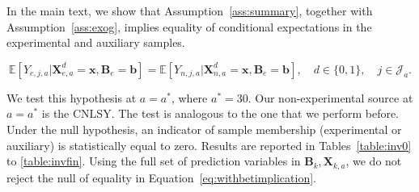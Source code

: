 \noindent In the main text, we show that Assumption~\ref{ass:summary}, together with Assumption~\ref{ass:exog}, implies equality of conditional expectations in the experimental and auxiliary samples.

\begin{equation}\label{eq:withbetimplication}
\mathbb{E} \left[ Y_{e,j,a} | \bm{X}^d_{e,a} = \bm{x}, \bm{B}_e = \bm{b} \right] = \mathbb{E} \left[ Y_{n,j,a} | \bm{X}^d_{n,a} = \bm{x}, \bm{B}_e = \bm{b} \right], \quad d \in \{0,1\}, \quad j \in \mathcal{J}_a.
\end{equation}

\noindent We test this hypothesis at $a = a^*$, where $a^*=30$. Our non-experimental source at $a = a^*$ is the CNLSY. The test is analogous to the one that we perform before. Under the null hypothesis, an indicator of sample membership (experimental or auxiliary) is statistically equal to zero. Results are reported in Tables~\ref{table:inv0} to \ref{table:invfin}. Using the full set of prediction variables in $\bm{B}_k, \bm{X}_{k,a}$, we do not reject the null of equality in Equation~\ref{eq:withbetimplication}.

